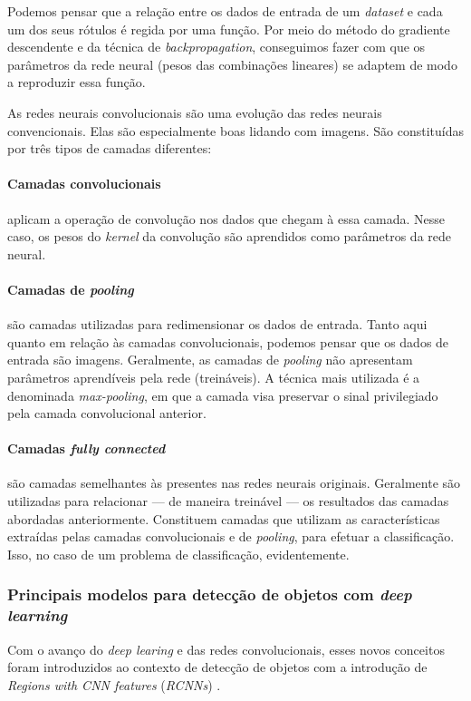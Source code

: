 Podemos pensar que a relação entre os dados de entrada de um \emph{dataset} e cada um dos seus rótulos é regida por uma função. Por meio do método do gradiente descendente e da técnica de \emph{backpropagation}, conseguimos fazer com que os parâmetros da rede neural (pesos das combinações lineares) se adaptem de modo a reproduzir essa função.

As redes neurais convolucionais são uma evolução das redes neurais convencionais. Elas são especialmente boas lidando com imagens. São constituídas por três tipos de camadas diferentes:

\paragraph{Camadas convolucionais} aplicam a operação de convolução nos dados que chegam à essa camada. Nesse caso, os pesos do \emph{kernel} da convolução são aprendidos como parâmetros da rede neural.

\paragraph{Camadas de \emph{pooling}} são camadas utilizadas para redimensionar os dados de entrada. Tanto aqui quanto em relação às camadas convolucionais, podemos pensar que os dados de entrada são imagens. Geralmente, as camadas de \emph{pooling} não apresentam parâmetros aprendíveis pela rede (treináveis). A técnica mais utilizada é a denominada \emph{max-pooling}, em que a camada visa preservar o sinal privilegiado pela camada convolucional anterior.

\paragraph{Camadas \emph{fully connected}} são camadas semelhantes às presentes nas redes neurais originais. Geralmente são utilizadas para relacionar --- de maneira treinável --- os resultados das camadas abordadas anteriormente. Constituem camadas que utilizam as características extraídas pelas camadas convolucionais e de \emph{pooling}, para efetuar a classificação. Isso, no caso de um problema de classificação, evidentemente.

\subsubsection{Principais modelos para detecção de objetos com \emph{deep learning}}
Com o avanço do \emph{deep learing} e das redes convolucionais, esses novos conceitos foram introduzidos ao contexto de detecção de objetos com a introdução de \emph{Regions with CNN features} (\emph{RCNNs}) \citep{Zou2019Object, rcnn1, rcnn2}.


